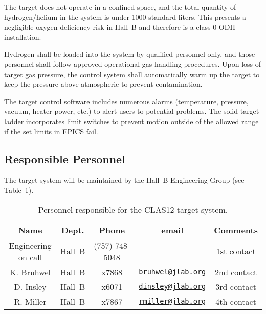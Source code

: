 The target does not operate in a confined space, and the total quantity of hydrogen/helium in 
the system is under 1000 standard liters. This presents a negligible oxygen deficiency risk in 
Hall~B and therefore is a class-0 ODH installation.

Hydrogen shall be loaded into the system by qualified personnel only, and those personnel shall 
follow approved operational gas handling procedures.   Upon loss of target gas pressure, the 
control system shall automatically warm up the target to keep the pressure above atmospheric to 
prevent contamination. 

The target control software includes numerous alarms (temperature, pressure, vacuum, heater 
power, etc.) to alert users to potential problems. The solid target ladder incorporates limit 
switches to prevent motion outside of the allowed range if the set limits in EPICS fail. 

\subsection{Responsible Personnel}

The target system will be maintained by the Hall~B Engineering Group (see Table~\ref{tb:target}).  

\begin{table}[!htb]
\centering
\begin{tabular}{|c|c|c|c|c|}
\hline
 Name&Dept.&Phone&email&Comments \\ \hline
Engineering on call & Hall~B&(757)-748-5048&& 1st contact  \\ \hline
K. Bruhwel& Hall~B&x7868&\href{mailto:bruhwel@jlab.org}{\nolinkurl{bruhwel@jlab.org}}&2nd contact \\ \hline
D. Insley & Hall~B&x6071&\href{mailto:dinsley@jlab.org}{\nolinkurl{dinsley@jlab.org}}  &3rd contact \\ \hline
R. Miller &Hall~B&x7867&\href{mailto:rmiller@jlab.org}{\nolinkurl{rmiller@jlab.org}} &4th contact \\ \hline
\end{tabular}
\caption{Personnel responsible for the CLAS12 target system.} 
\label{tb:target}
\end{table}
